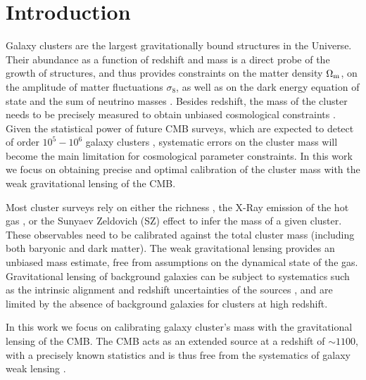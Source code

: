 \documentclass[prd, superscriptaddress, tightenlines, longbibliography, nofootinbib, eqsecnum, amsfonts, amsmath, floatfix, twocolumn, notitlepage]{revtex4-2}
\begin{document}
\tableofcontents
\section{Introduction}
\setcounter{footnote}{0}

Galaxy clusters are the largest gravitationally bound structures in the Universe. Their abundance as a function of redshift and mass is a direct probe of the growth of structures, and thus provides constraints on the matter density $\Omega_{\rm m}$, on the amplitude of matter fluctuations $\sigma_8$, as well as on the dark energy equation of state and the sum of neutrino masses \cite{Vikhlinin:2008ym,Sehgal:2010ca,Allen:2011zs,Planck:2013lkt, Mantz:2014xba,Mantz:2014paa, Planck:2015lwi,SPT:2016izt, SPT:2018njh}. Besides redshift, the mass of the cluster needs to be precisely measured to obtain unbiased cosmological constraints \cite{Pratt:2019cnf, Salvati:2020exw, Salvati:2021gkt}. Given the statistical power of future CMB surveys, which are expected to detect of order $10^5 - 10^6$ galaxy clusters \cite{Madhavacheril:2017onh, SimonsObservatory:2018koc, CMB-S4:2016ple}, systematic errors on the cluster mass will become the main limitation for cosmological parameter constraints. 
In this work we focus on obtaining precise and optimal calibration of the cluster mass with the weak gravitational lensing of the CMB. 

Most cluster surveys rely on either the richness \cite[e.g.][]{Koester:2007bj,DES:2015mqu,Andreon:2016eck, Farahi:2016xux,Simet:2016mzg}, the X-Ray emission of the hot gas \cite[e.g.][]{Arnaud:2005ur, Arnaud:2007br, Vikhlinin:2008ym}, or the Sunyaev Zeldovich (SZ) effect \cite[e.g.][]{Vanderlinde:2010eb, Planck:2013lkt,Planck:2015lwi} to infer the mass of a given cluster. These observables need to be calibrated against the total cluster mass (including both baryonic and dark matter). The weak gravitational lensing provides an unbiased mass estimate, free from assumptions on the dynamical state of the gas.
Gravitational lensing of background galaxies \cite{vonderLinden:2014haa, Hoekstra:2015gda, Smith:2015qhs, Sereno:2017zcn, Penna-Lima:2016tvo, Bellagamba:2018gec,Miyatake:2018lpb, Umetsu:2020wlf} can be subject to systematics such as the intrinsic alignment and  redshift uncertainties of the sources \cite{Becker:2010xj}, and are limited by the absence of background galaxies for clusters at high redshift. 

In this work we focus on calibrating galaxy cluster's mass with the gravitational lensing of the CMB. The CMB acts as an extended source at a redshift of $\sim 1100$, with a precisely known statistics and is thus free from the systematics of galaxy weak lensing \cite{Seljak:1999zn, Holder:2004rp, Baxter:2014frs, Melin:2014uaa, Louis:2016gvv, DES:2017fyz, Geach:2017crt, DES:2018myw,Zubeldia:2019brr, ACT:2020izl, SPT:2021efh}.
\end{document}
